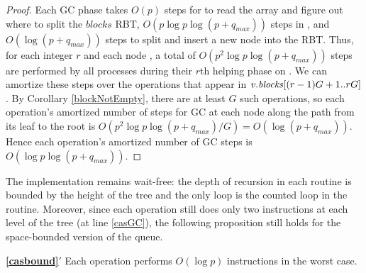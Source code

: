 \begin{proof}
Each GC phase takes $O(p)$ steps for  to read the  array and figure
out where to split the $blocks$ RBT, 
$O(p \log p \log(p+q_{max}))$ steps in ,
and $O(\log(p+q_{max}))$ steps to split and insert a new node into the RBT.
Thus, for each integer $r$ and each node , a total of $O(p^2\log p\log(p+q_{max}))$ steps
are performed by all processes during their $r$th helping phase on .
We can amortize these steps over the operations that appear in 
$\mbox{\textnormal{\textit{v}}}.\mbox{\textit{blocks}}[(r-1)G+1..rG]$.
By Corollary \ref{blockNotEmpty}, there are at least $G$ such operations, 
so each operation's amortized number of steps for GC at each node along the path from its leaf to the root
is $O(p^2\log p\log(p+q_{max})/G)=O(\log(p+q_{max}))$.
Hence each operation's amortized number of GC steps is $O(\log p\log(p+q_{max}))$.
\end{proof}

The implementation remains wait-free:  the depth of recursion in each routine is  bounded
by the height of the tree and the only loop is the counted loop in the  routine.
Moreover, since each operation still  does only two  instructions at each level of the tree (at line \ref{casGC}), the following proposition still holds for the space-bounded version of the queue.

\begin{customprop}{\textbf{\ref{casbound}}$'$}
Each operation performs $O(\log p)$  instructions in the worst case.
\end{customprop}

